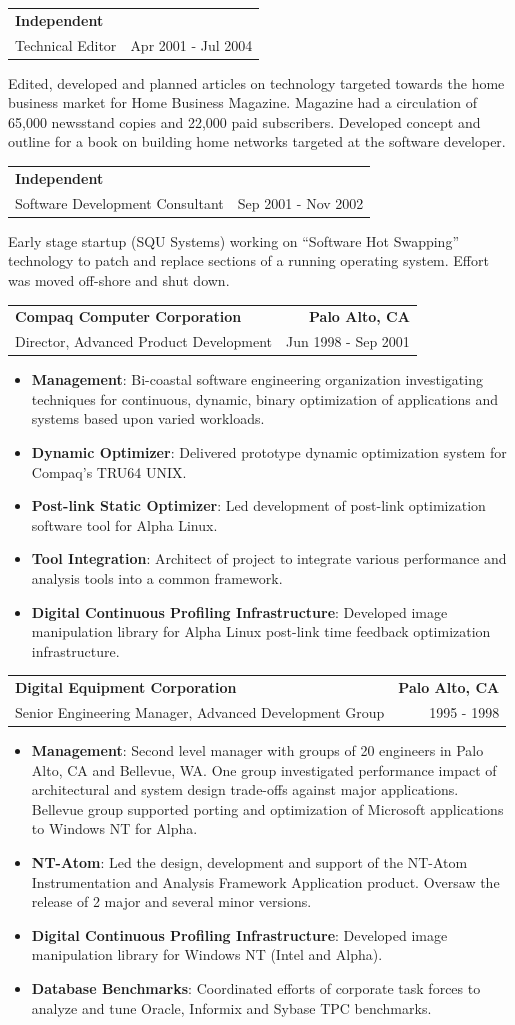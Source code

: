 \documentclass[letterpaper,11pt]{article}
\makeatletter
\newcommand{\resumeCompanyHeading}[4]{
  \vspace{-1pt}
    \item
    \begin{tabular*}{1.0\textwidth}[t]{l@{\extracolsep{\fill}}r}
      \textbf{#1} & \textbf{#2} \\
      {#3} & {#4}
    \end{tabular*}\vspace{-10pt}
  }
\newcommand{\resumeJobDescription}[1][]{
    \vspace{-1pt}\par{#1}
}
\newcommand{\resumeItem}[2]{\item{{\textbf{\small#1}}: {\small#2 \vspace{-1pt}}}}
\newcommand{\resumeItemListStart}{\begin{itemize}}
\newcommand{\resumeItemListEnd}{\end{itemize}}\vspace{-10pt}
\makeatother
\begin{document}
        \resumeCompanyHeading
            {Independent}{}
            {Technical Editor}{Apr 2001 - Jul 2004}
            \resumeJobDescription{Edited, developed and planned articles on technology targeted towards the home business market for Home Business Magazine.
              Magazine had a circulation of 65,000 newsstand copies and 22,000 paid subscribers. Developed concept and outline for a book on
              building home networks targeted at the software developer.}

        \resumeCompanyHeading
            {Independent}{}
            {Software Development Consultant}{Sep 2001 - Nov 2002}
            \resumeJobDescription{Early stage startup (SQU Systems) working on ``Software Hot Swapping'' technology to patch and replace sections of a running operating
                system. Effort was moved off-shore and shut down.}

        \resumeCompanyHeading
            {Compaq Computer Corporation}{Palo Alto, CA}
            {Director, Advanced Product Development}{Jun 1998 - Sep 2001}
            \resumeItemListStart
                \resumeItem{Management}{Bi-coastal software engineering organization investigating techniques for continuous, dynamic, binary optimization
                  of applications and systems based upon varied workloads.}
                \resumeItem{Dynamic Optimizer}{Delivered prototype dynamic optimization system for Compaq's TRU64 UNIX.}
                \resumeItem{Post-link Static Optimizer}{Led development of post-link optimization software tool for Alpha Linux.}
                \resumeItem{Tool Integration}{Architect of project to integrate various performance and analysis tools into a common framework.}
                \resumeItem{Digital Continuous Profiling Infrastructure}{Developed image manipulation library for Alpha Linux post-link time
                  feedback optimization infrastructure.}
            \resumeItemListEnd

        \resumeCompanyHeading
          {Digital Equipment Corporation}{Palo Alto, CA}
          {Senior Engineering Manager, Advanced Development Group}
          {1995 - 1998}
            \resumeItemListStart
                \resumeItem{Management}{Second level manager with groups of 20 engineers in Palo Alto, CA and Bellevue, WA. One group investigated performance
                  impact of architectural and system design trade-offs against major applications. Bellevue group supported porting and optimization
                  of Microsoft applications to Windows NT for Alpha.}
                \resumeItem{NT-Atom}{Led the design, development and support of the NT-Atom Instrumentation and Analysis Framework Application product.
                  Oversaw the release of 2 major and several minor versions.}
                \resumeItem{Digital Continuous Profiling Infrastructure}{Developed image manipulation library for Windows NT (Intel and Alpha).}
                \resumeItem{Database Benchmarks}{Coordinated efforts of corporate task forces to analyze and tune Oracle, Informix and Sybase TPC benchmarks.}
            \resumeItemListEnd
\end{document}
